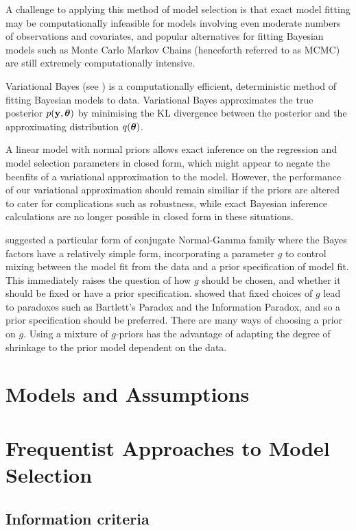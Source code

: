 \documentclass{amsart}[12pt]
\begin{document}
A challenge to applying this method of model selection is that exact model fitting may be computationally
infeasible for models involving even moderate numbers of observations and covariates, and popular alternatives
for fitting Bayesian models such as Monte Carlo Markov Chains (henceforth referred to as MCMC) are still
extremely computationally intensive.

Variational Bayes (see \citep{Ormerod2010}) is a computationally
efficient, deterministic method of fitting Bayesian models to data. Variational Bayes approximates the true
posterior $p({\bf y}, {\boldsymbol \theta})$ by minimising the KL divergence between the posterior and the  approximating
distribution $q({\boldsymbol \theta})$.

A linear model with normal priors allows exact inference on the regression and model selection parameters in
closed form, which might appear to negate the beenfits of a variational approximation to the model. However,
the performance of our variational approximation should remain similiar if the priors are altered to cater for
complications such as robustness, while exact Bayesian inference calculations are no longer possible in closed
form in these situations.

\citep{Zellner1986} suggested a particular form of conjugate Normal-Gamma family where the Bayes factors have a
relatively simple form, incorporating a parameter $g$ to control mixing between the model fit from the data
and a prior specification of model fit. This immediately raises the question of how $g$ should be chosen, and
whether it should be fixed or have a prior specification. \citep{Liang2008} showed that fixed choices of $g$
lead to paradoxes such as Bartlett's Paradox and the Information Paradox, and so a prior specification should
be preferred. There are many ways of choosing a prior on $g$. Using a mixture of $g$-priors has the advantage
of adapting the degree of shrinkage to the prior model dependent on the data.

\section{Models and Assumptions}

\section{Frequentist Approaches to Model Selection}
\subsection{Information criteria}
\end{document}

